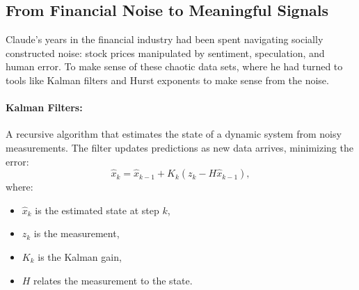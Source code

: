 

\newpage
\subsection*{From Financial Noise to Meaningful Signals}

Claude’s years in the financial industry had been spent navigating socially constructed noise: stock prices manipulated by sentiment, speculation, and human error. To make sense of these chaotic data sets, where he had turned to tools like Kalman filters and Hurst exponents to make sense from the noise.

\paragraph{Kalman Filters:} A recursive algorithm that estimates the state of a dynamic system from noisy measurements. The filter updates predictions as new data arrives, minimizing the error:
\[
\hat{x}_k = \hat{x}_{k-1} + K_k \left(z_k - H\hat{x}_{k-1}\right),
\]
where:
\begin{itemize}
    \item \(\hat{x}_k\) is the estimated state at step \(k\),
    \item \(z_k\) is the measurement,
    \item \(K_k\) is the Kalman gain,
    \item \(H\) relates the measurement to the state.
\end{itemize}

